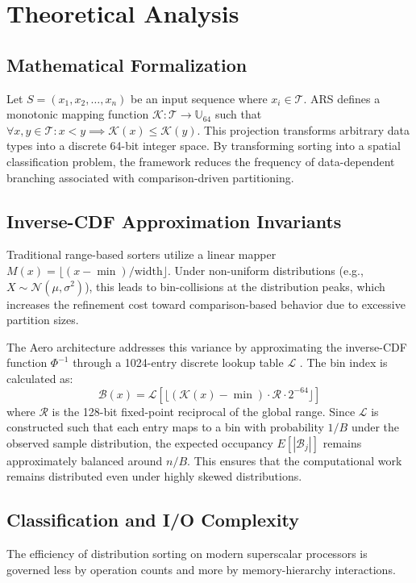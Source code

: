 \section{Theoretical Analysis}

\subsection{Mathematical Formalization}
Let $S = (x_1, x_2, \dots, x_n)$ be an input sequence where $x_i \in \mathcal{T}$.
ARS defines a monotonic mapping function $\mathcal{K}: \mathcal{T} \to \mathbb{U}_{64}$ such that $\forall x, y \in \mathcal{T} : x < y \implies \mathcal{K}(x) \leq \mathcal{K}(y)$.
This projection transforms arbitrary data types into a discrete 64-bit integer space.
By transforming sorting into a spatial classification problem, the framework reduces the frequency of data-dependent branching associated with comparison-driven partitioning.

\subsection{Inverse-CDF Approximation Invariants}
Traditional range-based sorters utilize a linear mapper $M(x) = \lfloor (x - \min) / \text{width} \rfloor$.
Under non-uniform distributions (e.g., $X \sim \mathcal{N}(\mu, \sigma^2)$), this leads to bin-collisions at the distribution peaks, which increases the refinement cost toward comparison-based behavior due to excessive partition sizes. 

The Aero architecture addresses this variance by approximating the inverse-CDF function $\Phi^{-1}$ through a 1024-entry discrete lookup table $\mathcal{L}$ \cite{devroyeNonUniformRandomVariate1986}.
The bin index is calculated as:
\begin{equation}
\mathcal{B}(x) = \mathcal{L} \left[ \lfloor (\mathcal{K}(x) - \min) \cdot \mathcal{R} \cdot 2^{-64} \rfloor \right]
\end{equation}
where $\mathcal{R}$ is the 128-bit fixed-point reciprocal of the global range. Since $\mathcal{L}$ is constructed such that each entry maps to a bin with probability $1/B$ under the observed sample distribution, the expected occupancy $E[|\mathcal{B}_j|]$ remains approximately balanced around $n/B$.
This ensures that the computational work remains distributed even under highly skewed distributions.

\subsection{Classification and I/O Complexity}
The efficiency of distribution sorting on modern superscalar processors is governed less by operation counts and more by memory-hierarchy interactions.

